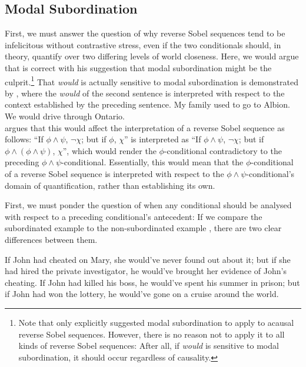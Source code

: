 \subsection{Modal Subordination}
First, we must answer the question of why reverse Sobel sequences tend to be infelicitous without contrastive stress, even if the two conditionals should, in theory, quantify over two differing levels of world closeness. Here, we would argue that \textcite{Klecha2014,Klecha2015} is correct with his suggestion that modal subordination might be the culprit.\footnote{Note that \textcite{Klecha2014,Klecha2015} only explicitly suggested modal subordination to apply to acausal reverse Sobel sequences. However, there is no reason not to apply it to all kinds of reverse Sobel sequences: After all, if \textit{would} is sensitive to modal subordination, it should occur regardless of causality.} That \textit{would} is actually sensitive to modal subordination is demonstrated by , where the \textit{would} of the second sentence is interpreted with respect to the context established by the preceding sentence.
\ex 
My family used to go to Albion. We would drive through Ontario.\\\emptyfill\parencite[p.~378]{Klecha2011} 
\xe
\textcite{Klecha2014,Klecha2015} argues that this would affect the interpretation of a reverse Sobel sequence as follows: \enquote{If $\phi\land\psi$, $\neg\chi$; but if $\phi$, $\chi$} is interpreted as \enquote{If $\phi\land\psi$, $\neg\chi$; but if $\phi\land(\phi\land\psi)$, $\chi$}, which would render the $\phi$-conditional contradictory to the preceding $\phi\land\psi$-conditional. Essentially, this would mean that the $\phi$-conditional of a reverse Sobel sequence is interpreted with respect to the $\phi\land\psi$-conditional's domain of quantification, rather than establishing its own. 

First, we must ponder the question of when any conditional should be analysed with respect to a preceding conditional's antecedent: If we compare the subordinated example  to the non-subordinated example , there are two clear differences between them. 

\ex
{}
If John had cheated on Mary, she would've never found out about it; but if she had hired the private investigator, he would've brought her evidence of John's cheating.
\xe
\ex
{}If John had killed his boss, he would've spent his summer in prison; but if John had won the lottery, he would've gone on a cruise around the world.
\xe

